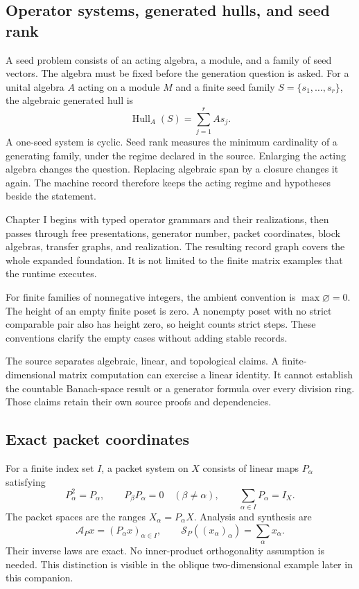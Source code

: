 \documentclass[a4paper,11pt]{article}
\newcommand{\Hull}{\operatorname{Hull}}\newcommand{\srank}{\operatorname{srank}}\newcommand{\psrank}{\operatorname{psrank}}\newcommand{\End}{\operatorname{End}}\newcommand{\Hom}{\operatorname{Hom}}\newcommand{\im}{\operatorname{im}}\newcommand{\Ker}{\operatorname{Ker}}\newcommand{\Jac}{\operatorname{Jac}}\newcommand{\Irr}{\operatorname{Irr}}\newcommand{\Span}{\operatorname{span}}\newcommand{\alg}{\operatorname{alg}}\newcommand{\Reach}{\operatorname{Reach}}\newcommand{\Supp}{\operatorname{Supp}}\newcommand{\id}{\mathrm{id}}\newcommand{\cl}[1]{\overline{#1}}
\begin{document}
\subsection{Operator systems, generated hulls, and seed rank}
A seed problem consists of an acting algebra, a module, and a family of seed vectors. The algebra must be fixed before the generation question is asked. For a unital algebra $A$ acting on a module $M$ and a finite seed family $S=\{s_1,\ldots,s_r\}$, the algebraic generated hull is
\[
\Hull_A(S)=\sum_{j=1}^{r}As_j.
\]
A one-seed system is cyclic. Seed rank measures the minimum cardinality of a generating family, under the regime declared in the source. Enlarging the acting algebra changes the question. Replacing algebraic span by a closure changes it again. The machine record therefore keeps the acting regime and hypotheses beside the statement.

Chapter I begins with typed operator grammars and their realizations, then passes through free presentations, generator number, packet coordinates, block algebras, transfer graphs, and realization. The resulting record graph covers the whole expanded foundation. It is not limited to the finite matrix examples that the runtime executes.

For finite families of nonnegative integers, the ambient convention is $\max\varnothing=0$. The height of an empty finite poset is zero. A nonempty poset with no strict comparable pair also has height zero, so height counts strict steps. These conventions clarify the empty cases without adding stable records.

The source separates algebraic, linear, and topological claims. A finite-dimensional matrix computation can exercise a linear identity. It cannot establish the countable Banach-space result or a generator formula over every division ring. Those claims retain their own source proofs and dependencies.
\subsection{Exact packet coordinates}
For a finite index set $I$, a packet system on $X$ consists of linear maps $P_\alpha$ satisfying
\[
P_\alpha^2=P_\alpha,\qquad
P_\beta P_\alpha=0\quad(\beta\ne\alpha),\qquad
\sum_{\alpha\in I}P_\alpha=I_X.
\]
The packet spaces are the ranges $X_\alpha=P_\alpha X$. Analysis and synthesis are
\[
\mathcal A_Px=(P_\alpha x)_{\alpha\in I},\qquad
\mathcal S_P((x_\alpha)_\alpha)=\sum_\alpha x_\alpha.
\]
Their inverse laws are exact. No inner-product orthogonality assumption is needed. This distinction is visible in the oblique two-dimensional example later in this companion.
\end{document}
